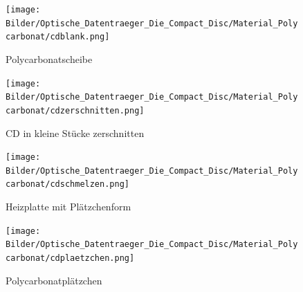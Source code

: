 \begin{figure}[h]
    \begin{center}
        \begin{minipage}[t]{0.4\textwidth}
            \begin{center}
                \texttt{[image: Bilder/Optische\_Datentraeger\_Die\_Compact\_Disc/Material\_Polycarbonat/cdblank.png]}
                \caption[Polycarbonatscheibe]{Polycarbonatscheibe}
                \label{fig:cdblank}
            \end{center}
        \end{minipage}
        \hspace{0.025\textwidth}
        \begin{minipage}[t]{0.4\textwidth}
            \begin{center}
                \texttt{[image: Bilder/Optische\_Datentraeger\_Die\_Compact\_Disc/Material\_Polycarbonat/cdzerschnitten.png]}
                \caption[CD in kleine Stücke zerschnitten]{CD in kleine Stücke zerschnitten}
                \label{fig:cdzerschnitten}
            \end{center}
        \end{minipage}
    \end{center}
\end{figure}

\begin{figure}[h]
    \begin{center}
        \begin{minipage}[t]{0.4\textwidth}
            \begin{center}
                \texttt{[image: Bilder/Optische\_Datentraeger\_Die\_Compact\_Disc/Material\_Polycarbonat/cdschmelzen.png]}
                \caption[Heizplatte mit Plätzchenform]{Heizplatte mit Plätzchenform}
                \label{fig:cdschmelzen}
            \end{center}
        \end{minipage}
        \hspace{0.025\textwidth}
        \begin{minipage}[t]{0.4\textwidth}
            \begin{center}
                \texttt{[image: Bilder/Optische\_Datentraeger\_Die\_Compact\_Disc/Material\_Polycarbonat/cdplaetzchen.png]}
                \caption[\glqq Polycarbonatplätzchen\grqq{}]{\glqq Polycarbonatplätzchen\grqq{}}
                \label{fig:cdplaetzchen}
            \end{center}
        \end{minipage}
    \end{center}
\end{figure}

